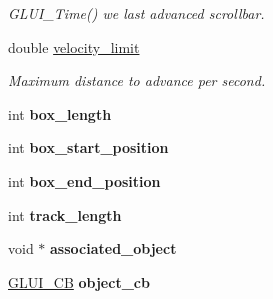 \begin{DoxyCompactItemize}
\begin{DoxyCompactList}\small\item\em G\+L\+U\+I\+\_\+\+Time() we last advanced scrollbar. \end{DoxyCompactList}\item 
\hypertarget{class_g_l_u_i___scrollbar_a3d738432dded440f6733bdd95116622e}{double \hyperlink{class_g_l_u_i___scrollbar_a3d738432dded440f6733bdd95116622e}{velocity\+\_\+limit}}\label{class_g_l_u_i___scrollbar_a3d738432dded440f6733bdd95116622e}

\begin{DoxyCompactList}\small\item\em Maximum distance to advance per second. \end{DoxyCompactList}\item 
\hypertarget{class_g_l_u_i___scrollbar_a9970e334cae062771414f55c0b846270}{int {\bfseries box\+\_\+length}}\label{class_g_l_u_i___scrollbar_a9970e334cae062771414f55c0b846270}

\item 
\hypertarget{class_g_l_u_i___scrollbar_a6b7284df7537af88d8acdd643f807210}{int {\bfseries box\+\_\+start\+\_\+position}}\label{class_g_l_u_i___scrollbar_a6b7284df7537af88d8acdd643f807210}

\item 
\hypertarget{class_g_l_u_i___scrollbar_a75a697d414c0efe18070ca93a0961091}{int {\bfseries box\+\_\+end\+\_\+position}}\label{class_g_l_u_i___scrollbar_a75a697d414c0efe18070ca93a0961091}

\item 
\hypertarget{class_g_l_u_i___scrollbar_afdbce9591fda4c231f926d0f737b2dad}{int {\bfseries track\+\_\+length}}\label{class_g_l_u_i___scrollbar_afdbce9591fda4c231f926d0f737b2dad}

\item 
\hypertarget{class_g_l_u_i___scrollbar_a64562211dfbeda1a831b87f5116e639d}{void $\ast$ {\bfseries associated\+\_\+object}}\label{class_g_l_u_i___scrollbar_a64562211dfbeda1a831b87f5116e639d}

\item 
\hypertarget{class_g_l_u_i___scrollbar_a16a50358fbc1f82d4c6932ea0eb93bef}{\hyperlink{class_g_l_u_i___c_b}{G\+L\+U\+I\+\_\+\+C\+B} {\bfseries object\+\_\+cb}}\label{class_g_l_u_i___scrollbar_a16a50358fbc1f82d4c6932ea0eb93bef}

\end{DoxyCompactItemize}
